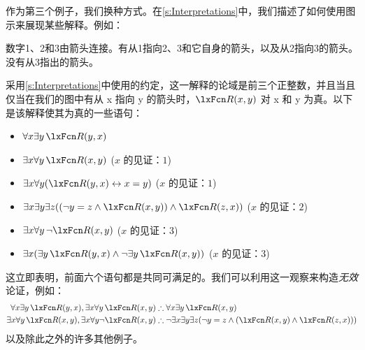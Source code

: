 作为第三个例子，我们换种方式。在\cref{s:Interpretations}中，我们描述了如何使用图示来展现某些解释。例如：

\begin{center}
	\begin{arialabel}{数字1、2和3由箭头连接。有从1指向2、3和它自身的箭头，以及从2指向3的箭头。没有从3指出的箭头。}
\end{arialabel}
\end{center}


采用\cref{s:Interpretations}中使用的约定，这一解释的论域是前三个正整数，并且当且仅当在我们的图中有从 x 指向 y 的箭头时，$\atom{R}{x,y}$ 对 x 和 y 为真。以下是该解释使其为真的一些语句：

\begin{itemize}
	\item $\forall x \exists y\, \atom{R}{y,x}$
	\item $\exists x \forall y\, \atom{R}{x,y}$ \hfill ($x$ 的见证：$1$)
	\item $\exists x \forall y (\atom{R}{y,x} \eiff x = y)$ \hfill ($x$ 的见证：$1$)
	\item $\exists x \exists y \exists z ((\enot y = z \eand \atom{R}{x,y}) \eand \atom{R}{z,x})$ \hfill ($x$ 的见证：$2$)
	\item $\exists x \forall y\, \enot \atom{R}{x,y}$ \hfill ($x$ 的见证：$3$)
	\item $\exists x (\exists y\, \atom{R}{y,x} \eand \enot \exists y\, \atom{R}{x,y})$ \hfill ($x$ 的见证：$3$)
\end{itemize}


这立即表明，前面六个语句都是共同可满足的。我们可以利用这一观察来构造\emph{无效}论证，例如：
\begin{align*}
	\forall x \exists y\, \atom{R}{y,x}, \exists x \forall y\, \atom{R}{x,y}  &\therefore  \forall x \exists y\, \atom{R}{x,y}\\
	\exists x \forall y\, \atom{R}{x,y}, \exists x \forall y \enot \atom{R}{x,y} & \therefore \enot \exists x \exists y \exists z (\enot y = z \eand (\atom{R}{x,y} \eand \atom{R}{z,x}))
\end{align*}
以及除此之外的许多其他例子。

